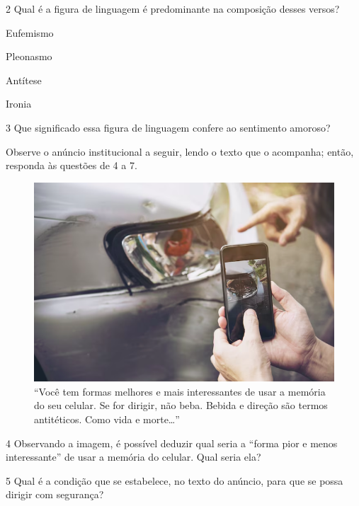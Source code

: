 \pagebreak
\num{2} Qual é a figura de linguagem é predominante na composição desses versos?

\begin{boxlist}
 Eufemismo

 Pleonasmo

 Antítese

 Ironia
\end{boxlist}

\num{3} Que significado essa figura de linguagem confere ao sentimento
amoroso?


Observe o anúncio institucional a seguir, lendo o texto que o acompanha;
então, responda às questões de 4 a 7.

\begin{figure}[htpb!]
\centering
\includegraphics[width=\textwidth]{./media/img6pt.png}
\caption{``Você tem formas melhores e mais interessantes de usar a memória do seu
celular. Se for dirigir, não beba. Bebida e direção são termos
antitéticos. Como vida e morte\ldots{}''}
\end{figure}

\num{4} Observando a imagem, é possível deduzir qual seria a ``forma
pior e menos interessante'' de usar a memória do celular. Qual seria
ela?


\num{5} Qual é a condição que se estabelece, no texto do anúncio, para
que se possa dirigir com segurança?

